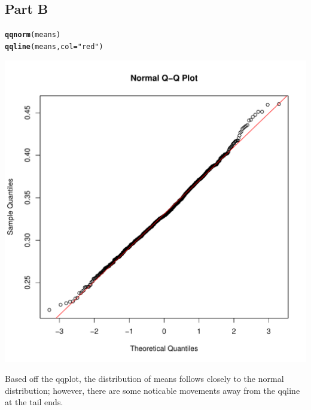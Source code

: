\documentclass{article}\usepackage[]{graphicx}\usepackage[]{color}
\makeatletter
\newcommand{\hlstr}[1]{\textcolor[rgb]{0.192,0.494,0.8}{#1}}%
\newcommand{\hlstd}[1]{\textcolor[rgb]{0.345,0.345,0.345}{#1}}%
\newcommand{\hlkwc}[1]{\textcolor[rgb]{0.333,0.667,0.333}{#1}}%
\newcommand{\hlkwd}[1]{\textcolor[rgb]{0.737,0.353,0.396}{\textbf{#1}}}%
\newenvironment{kframe}{%
 \def\at@end@of@kframe{}%
 \ifinner\ifhmode%
  \def\at@end@of@kframe{\end{minipage}}%
  \begin{minipage}{\columnwidth}%
 \fi\fi%
 \def\FrameCommand##1{\hskip\@totalleftmargin \hskip-\fboxsep
 \colorbox{shadecolor}{##1}\hskip-\fboxsep
     \hskip-\linewidth \hskip-\@totalleftmargin \hskip\columnwidth}%
 \MakeFramed {\advance\hsize-\width
   \@totalleftmargin\z@ \linewidth\hsize
   \@setminipage}}%
 {\par\unskip\endMakeFramed%
 \at@end@of@kframe}
\newenvironment{knitrout}{}{} %
\makeatother
\begin{document}
\subsection*{Part B}
\begin{knitrout}
\color{fgcolor}\begin{kframe}
\begin{alltt}
\hlkwd{qqnorm}\hlstd{(means)}
\hlkwd{qqline}\hlstd{(means,} \hlkwc{col} \hlstd{=} \hlstr{"red"}\hlstd{)}
\end{alltt}
\end{kframe}
\includegraphics[width=0.50\linewidth]{figure/unnamed-chunk-8-1} 

\end{knitrout}
Based off the qqplot, the distribution of means follows closely to the normal distribution; however, there are some noticable movements away from the qqline at the tail ends. 
\end{document}
